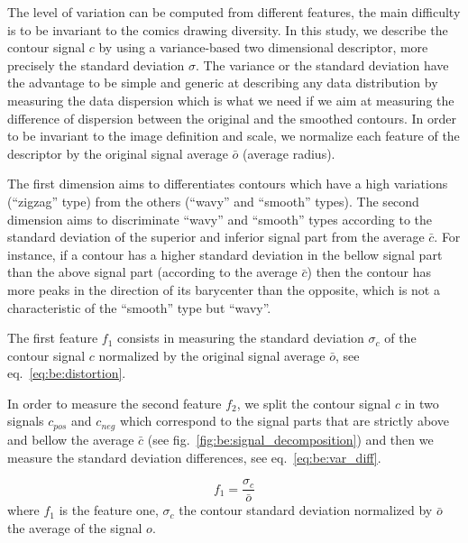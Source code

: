 The level of variation can be computed from different features, the main difficulty is to be invariant to the comics drawing diversity. 
In this study, we describe the contour signal $c$ by using a variance-based two dimensional descriptor, more precisely the standard deviation $\sigma$. The variance or the standard deviation have the advantage to be simple and generic at describing any data distribution by measuring the data dispersion which is what we need if we aim at measuring the difference of dispersion between the original and the smoothed contours. In order to be invariant to the image definition and scale, we normalize each feature of the descriptor by the original signal average $\bar{o}$ (average radius).

The first dimension aims to differentiates contours which have a high variations (``zigzag'' type) from the others (``wavy'' and ``smooth'' types). The second dimension aims to discriminate ``wavy'' and ``smooth'' types according to the standard deviation of the superior and inferior signal part from the average $\bar{c}$. For instance, if a contour has a higher standard deviation in the bellow signal part than the above signal part (according to the average $\bar{c}$) then the contour has more peaks in the direction of its barycenter than the opposite, which is not a characteristic of the ``smooth'' type but ``wavy''.

The first feature $f_1$ consists in measuring the standard deviation $\sigma_c$ of the contour signal $c$ normalized by the original signal average $\bar{o}$, see eq.~\ref{eq:be:distortion}.

In order to measure the second feature $f_2$, we split the contour signal $c$ in two signals $c_{pos}$ and $c_{neg}$ which correspond to the signal parts that are strictly above and bellow the average $\bar{c}$ (see fig.~\ref{fig:be:signal_decomposition}) and then we measure the standard deviation differences, see eq.~\ref{eq:be:var_diff}.%

\begin{equation}\label{eq:be:distortion}
 f_1 = \frac{\sigma_c}{\bar{o}}%
\end{equation}
where $f_1$ is the feature one, $\sigma_c$ the contour standard deviation normalized by $\bar{o}$ the average of the signal $o$. 


